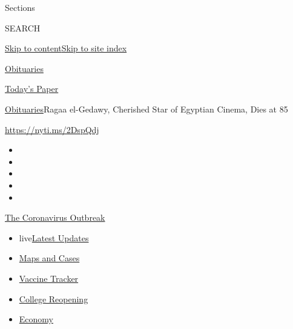 Sections

SEARCH

\protect\hyperlink{site-content}{Skip to
content}\protect\hyperlink{site-index}{Skip to site index}

\href{https://www.nytimes3xbfgragh.onion/section/obituaries}{Obituaries}

\href{https://myaccount.nytimes3xbfgragh.onion/auth/login?response_type=cookie\&client_id=vi}{}

\href{https://www.nytimes3xbfgragh.onion/section/todayspaper}{Today's
Paper}

\href{/section/obituaries}{Obituaries}\textbar{}Ragaa el-Gedawy,
Cherished Star of Egyptian Cinema, Dies at 85

\url{https://nyti.ms/2DspQdj}

\begin{itemize}
\item
\item
\item
\item
\item
\end{itemize}

\href{https://www.nytimes3xbfgragh.onion/news-event/coronavirus?action=click\&pgtype=Article\&state=default\&region=TOP_BANNER\&context=storylines_menu}{The
Coronavirus Outbreak}

\begin{itemize}
\tightlist
\item
  live\href{https://www.nytimes3xbfgragh.onion/2020/08/04/world/coronavirus-covid-19.html?action=click\&pgtype=Article\&state=default\&region=TOP_BANNER\&context=storylines_menu}{Latest
  Updates}
\item
  \href{https://www.nytimes3xbfgragh.onion/interactive/2020/us/coronavirus-us-cases.html?action=click\&pgtype=Article\&state=default\&region=TOP_BANNER\&context=storylines_menu}{Maps
  and Cases}
\item
  \href{https://www.nytimes3xbfgragh.onion/interactive/2020/science/coronavirus-vaccine-tracker.html?action=click\&pgtype=Article\&state=default\&region=TOP_BANNER\&context=storylines_menu}{Vaccine
  Tracker}
\item
  \href{https://www.nytimes3xbfgragh.onion/2020/08/02/us/covid-college-reopening.html?action=click\&pgtype=Article\&state=default\&region=TOP_BANNER\&context=storylines_menu}{College
  Reopening}
\item
  \href{https://www.nytimes3xbfgragh.onion/live/2020/08/03/business/stock-market-today-coronavirus?action=click\&pgtype=Article\&state=default\&region=TOP_BANNER\&context=storylines_menu}{Economy}
\end{itemize}

